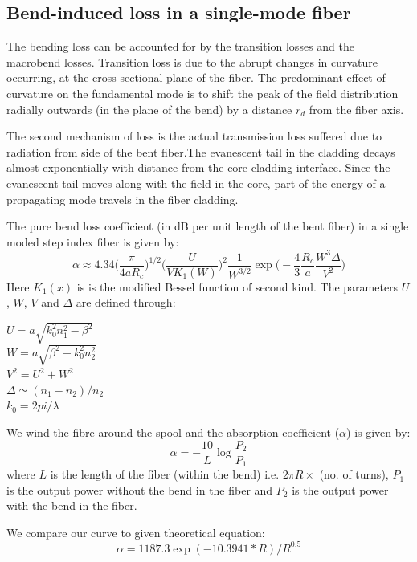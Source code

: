\documentclass[%
 reprint,
nofootinbib,
 amsmath,amssymb,
 aps,
]{revtex4-2}
\begin{document}
\subsection{Bend-induced loss in a single-mode fiber}
The bending loss can be accounted for by the transition
losses and the macrobend losses. Transition loss is due to
the abrupt changes in curvature occurring, at the cross sectional plane of the fiber. The predominant effect of curvature on the fundamental mode is to shift the peak of the field
distribution radially outwards (in the plane of the bend) by
a distance $ r_d $ from the fiber axis.

The second mechanism of loss is the actual transmission
loss suffered due to radiation from side of the bent fiber.The
evanescent tail in the cladding decays almost exponentially
with distance from the core-cladding interface. Since the
evanescent tail moves along with the field in the core, part
of the energy of a propagating mode travels in the fiber
cladding.

The pure bend loss coefficient (in dB per unit length of
the bent fiber) in a single moded step index fiber is given by:
\begin{equation}\label{key}
	\alpha \approx 4.34 \Bigg(\dfrac{\pi}{4aR_c}\Bigg)^{1/2} \Bigg(\dfrac{U}{V K_1(W)}\Bigg)^2 \dfrac{1}{W^{3/2}} \exp \Big(-\dfrac{4}{3} \dfrac{R_c}{a} \dfrac{W^3 \Delta}{V^2}\Big)
\end{equation}
Here $ K_1(x) $ is is the modified Bessel function of second kind. The
parameters $ U $ , $ W $, $ V $ and $ \Delta $ are defined through:
\begin{center}
	$ U = a \sqrt{k_0^2 n_1^2 - \beta^2} $ \\
	$ W = a \sqrt{\beta^2 - k_0^2 n_2^2}$ \\
	$ V^2 = U^2 + W^2 $ \\
	$ \Delta \simeq (n_1 - n_2)/n_2 $ \\
	$ k_0 = 2 pi/ \lambda $
\end{center}
We wind the fibre around the spool and the absorption coefficient ($ \alpha $) is given by:
\begin{equation}\label{key}
	\alpha = -\dfrac{10}{L} \log \dfrac{P_2}{P_1}
\end{equation}
where $ L $ is the length of the fiber (within the bend) i.e.
$ 2\pi R \times $ (no. of turns), $ P_1 $ is the output power without the
bend in the fiber and $ P_2 $ is the output power with the bend
in the fiber.

We compare our curve to given theoretical equation:
\begin{equation}\label{key}
	\alpha = 1187.3 \exp(-10.3941*R)/R^{0.5}
\end{equation}
\end{document}
